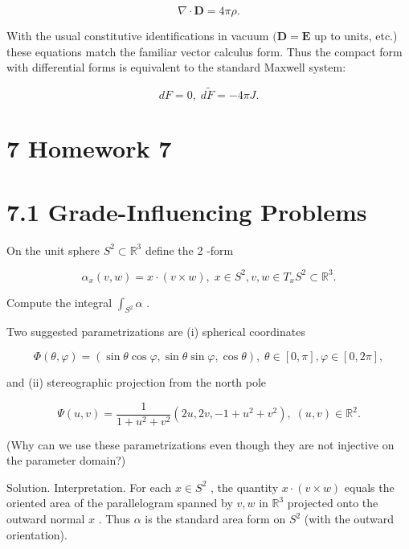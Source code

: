 \documentclass[10pt]{article}
\begin{document}
\[
\nabla  \cdot  \mathbf{D} = {4\pi \rho }.
\]

With the usual constitutive identifications in vacuum \((\mathbf{D} = \mathbf{E}\) up to units, etc.) these equations match the familiar vector calculus form. Thus the compact form with differential forms is equivalent to the standard Maxwell system:

\[
{dF} = 0,\;d\widetilde{F} =  - {4\pi J}.
\]

\section*{7 Homework 7}

\section*{7.1 Grade-Influencing Problems}

\begin{problem}[title=PROBLEM 1 (8 POINTS)]
On the unit sphere \({S}^{2} \subset  {\mathbb{R}}^{3}\) define the 2 -form

\[
{\alpha }_{x}\left( {v,w}\right)  = x \cdot  \left( {v \times  w}\right) ,\;x \in  {S}^{2},v,w \in  {T}_{x}{S}^{2} \subset  {\mathbb{R}}^{3}.
\]

Compute the integral \({\int }_{{S}^{2}}\alpha\) .

Two suggested parametrizations are (i) spherical coordinates

\[
\Phi \left( {\theta ,\varphi }\right)  = \left( {\sin \theta \cos \varphi ,\sin \theta \sin \varphi ,\cos \theta }\right) ,\;\theta  \in  \left\lbrack  {0,\pi }\right\rbrack  ,\varphi  \in  \left\lbrack  {0,{2\pi }}\right\rbrack  ,
\]

and (ii) stereographic projection from the north pole

\[
\Psi \left( {u,v}\right)  = \frac{1}{1 + {u}^{2} + {v}^{2}}\left( {{2u},{2v}, - 1 + {u}^{2} + {v}^{2}}\right) ,\;\left( {u,v}\right)  \in  {\mathbb{R}}^{2}.
\]

(Why can we use these parametrizations even though they are not injective on the parameter domain?)
\end{problem}

Solution. Interpretation. For each \(x \in  {S}^{2}\) , the quantity \(x \cdot  \left( {v \times  w}\right)\) equals the oriented area of the parallelogram spanned by \(v,w\) in \({\mathbb{R}}^{3}\) projected onto the outward normal \(x\) . Thus \(\alpha\) is the standard area form on \({S}^{2}\) (with the outward orientation).
\end{document}
